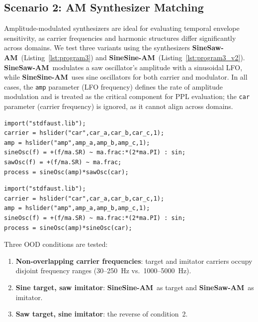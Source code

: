 \documentclass[runningheads]{llncs}
\newcommand{\FMMod}{\textbf{SineSaw-AM}\xspace}
\newcommand{\FMModvtwo}{\textbf{SineSine-AM}\xspace}
\begin{document}
\subsection{Scenario 2: AM Synthesizer Matching}
Amplitude-modulated synthesizers are ideal for evaluating temporal envelope sensitivity, as carrier frequencies and harmonic structures differ significantly across domains.  
We test three variants using the synthesizers \FMMod\ (Listing~\ref{lst:program3}) and \FMModvtwo\ (Listing~\ref{lst:program3_v2}).  
\FMMod\ modulates a saw oscillator’s amplitude with a sinusoidal LFO, while \FMModvtwo\ uses sine oscillators for both carrier and modulator.  
In all cases, the \texttt{amp} parameter (LFO frequency) defines the rate of amplitude modulation and is treated as the critical component for PPL evaluation; the \texttt{car} parameter (carrier frequency) is ignored, as it cannot align across domains.

\begin{lstlisting}[caption={\FMMod}, label={lst:program3},language=Faust,float,floatplacement=!H,xleftmargin=1em,xrightmargin=0.5em,firstnumber=0,aboveskip=0em, belowskip=-1em]
import("stdfaust.lib");
carrier = hslider("car",car_a,car_b,car_c,1);
amp = hslider("amp",amp_a,amp_b,amp_c,1);
sineOsc(f) = +(f/ma.SR) ~ ma.frac:*(2*ma.PI) : sin;
sawOsc(f) = +(f/ma.SR) ~ ma.frac;
process = sineOsc(amp)*sawOsc(car);
\end{lstlisting}

\begin{lstlisting}[caption={\FMModvtwo}, label={lst:program3_v2},language=Faust,float,floatplacement=!H,xleftmargin=1em,xrightmargin=0.5em,firstnumber=0,aboveskip=0em, belowskip=-1em]
import("stdfaust.lib");
carrier = hslider("car",car_a,car_b,car_c,1);
amp = hslider("amp",amp_a,amp_b,amp_c,1);
sineOsc(f) = +(f/ma.SR) ~ ma.frac:*(2*ma.PI) : sin;
process = sineOsc(amp)*sineOsc(car);
\end{lstlisting}

Three OOD conditions are tested:
\begin{enumerate}
  \item \textbf{Non-overlapping carrier frequencies}: target and imitator carriers occupy disjoint frequency ranges (30–250~Hz vs.~1000–5000~Hz).  
  \item \textbf{Sine target, saw imitator}: \FMModvtwo\ as target and \FMMod\ as imitator.  
  \item \textbf{Saw target, sine imitator}: the reverse of condition~2.  
\end{enumerate}
\end{document}
